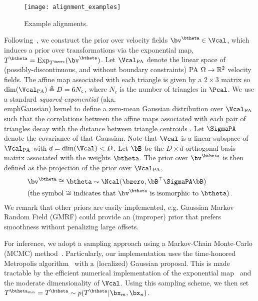 \documentclass[twoside]{article}
\DeclareMathOperator{\Exp}{Exp}
\newcommand{\T}{^{\top}}
\begin{document}
\begin{figure*}
      \centering
      \texttt{[image: alignment\_examples]}
      \caption{Example alignments.}
      \label{fig:align_examples}
    \end{figure*}
  
    Following~\cite{freifeld2015transform}, we construct the prior over velocity fields $\bv^\btheta \in \Vcal$, which
    induces a prior over transformations via the exponential map,
    $T^\btheta = \Exp_{T^{\bzero}}(\bv^\btheta)$.
    Let $\Vpa$ denote the linear space of (possibly-discontinuous, and without
    boundary constraints) PA $\Omega \to \mathbb{R}^2$ velocity fields. 
    The affine map associated with each triangle is given by a $2 \times 3$ matrix
    so $\dim(\Vpa) \triangleq D = 6 N_c$, where $N_c$ is the number of
    triangles in $\Pcal$. We use a standard \emph{squared-exponential}
    (aka.\\emph{Gaussian}) kernel to define a zero-mean Gaussian distribution
    over $\Vpa$ such that the correlations between the affine maps associated
    with each pair of triangles decay with the distance between triangle centroids \cite{freifeld2015transform}.
    Let $\SigmaPA$ denote the covariance of that Gaussian. Note that $\Vcal$
    is a linear subspace of $\Vpa$ with $d = \dim(\Vcal) < D$.
    Let $\bB$ be the $D \times d$ orthogonal basis matrix associated with the weights
    $\btheta$. The prior over $\bv^\btheta$ is then defined as the projection of the
    prior over $\Vpa$,
    \begin{align}
      &\bv^\btheta \cong \btheta \sim \Ncal(\bzero, \bB\T \SigmaPA \bB)
      \\
       &\text{(the symbol $\cong$ indicates that $\bv^\btheta$ is isomorphic to $\btheta$)}\, . %
       \nonumber
    \end{align}
    We remark that other priors are easily implemented, e.g.\a%
    Gaussian Markov Random Field (GMRF) could provide an (improper) prior that
    prefers smoothness without penalizing large offsets.

    For inference, we adopt a sampling approach using a Markov-Chain Monte-Carlo (MCMC) method~\cite{Robert:Book:MCMC:2004}.    
    Particularly, our implementation uses the time-honored Metropolis algorithm~\cite{metropolis1953equation}
    with a (localized) Gaussian proposal.
    This is made tractable by the efficient numerical implementation of the exponential map~\cite{freifeld2015transform}
    and the moderate dimensionality of $\Vcal$.
    Using this sampling scheme, we then set $T^{\btheta_{mn}} = T^{\btheta} \sim p(T^{\btheta_{}} | \bx_m, \bx_n) $.
    
\end{document}
